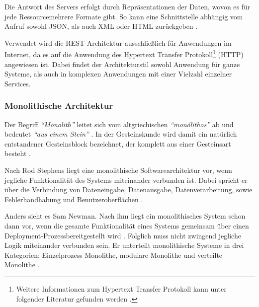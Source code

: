 Die Antwort des Servers erfolgt durch Repräsentationen der Daten, wovon es für jede Ressource\footnotemark mehrere Formate gibt. So kann eine Schnittstelle abhängig vom Aufruf sowohl JSON, als auch XML oder HTML zurückgeben \parencite[vgl.][S. 128]{starke_effektive_2015}.

Verwendet wird die REST-Architektur ausschließlich für Anwendungen im Internet, da es auf die Anwendung des Hypertext Transfer Protokoll\footnote{Weitere Informationen zum Hypertext Transfer Protokoll kann unter folgender Literatur gefunden werden \parencite{leach_hypertext_2020}.} (HTTP) angewiesen ist. Dabei findet der Architekturstil sowohl Anwendung für ganze Systeme, als auch in komplexen Anwendungen mit einer Vielzahl einzelner Services.

\subsubsection{Monolithische Architektur}
\label{sec:monolith}

Der Begriff \textit{\enquote{Monolith}} leitet sich vom altgriechischen \textit{\enquote{monólithos}} ab und bedeutet \textit{\enquote{aus einem Stein}} \parencites[vgl.][]{duden_nodate}[vgl.][]{dwds_nodate}. In der Gesteinskunde wird damit ein natürlich entstandener Gesteinsblock bezeichnet, der komplett aus einer Gesteinsart besteht \parencite[vgl.][]{dwds_nodate}.

Nach Rod Stephens liegt eine monolithische Softwarearchitektur vor, wenn jegliche Funktionalität des Systems miteinander verbunden ist. Dabei spricht er über die Verbindung von Dateneingabe, Datenausgabe, Datenverarbeitung, sowie Fehlerhandhabung und Benutzeroberflächen \parencite[vgl.][S. 94]{stephens_beginning_2015}.

Anders sieht es Sam Newman. Nach ihm liegt ein monolithisches System schon dann vor, wenn die gesamte Funktionalität eines Systems gemeinsam über einen Deployment-Prozess\footnotemark bereitgestellt wird \parencite[vgl.][Kap. 2.2]{newman_monolith_2019}. Folglich muss nicht zwingend jegliche Logik miteinander verbunden sein. Er unterteilt monolithische Systeme in drei Kategorien: Einzelprozess Monolithe, modulare Monolithe und verteilte Monolithe \parencite[vgl.][Kap. 2.2]{newman_monolith_2019}.


